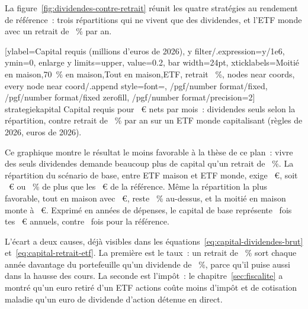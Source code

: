 La figure~\ref{fig:dividendes-contre-retrait} r\'eunit les quatre strat\'egies au rendement de
r\'ef\'erence~: trois r\'epartitions qui ne vivent que des dividendes, et l'ETF monde avec un retrait
de \TauxRetrait~\% par an.

[ylabel={Capital requis (millions d'euros de 2026)},
  y filter/.expression={y/1e6}, ymin=0, enlarge y limits={upper, value=0.2}, bar width=24pt,
  xticklabels={{Moiti\'e en maison},{70~\% en maison},{Tout en maison},{ETF, retrait \TauxRetrait~\%}},
  nodes near coords, every node near coord/.append style={font=\scriptsize,
    /pgf/number format/fixed, /pgf/number format/fixed zerofill, /pgf/number format/precision=2}]%
  {strategie}{kapital}%
  {Capital requis pour \ZielMonat~€ nets par mois~: dividendes seuls selon la r\'epartition, contre
  retrait de \TauxRetrait~\% par an sur un ETF monde capitalisant (r\`egles de 2026, euros de
  2026).\label{fig:dividendes-contre-retrait}}

Ce graphique montre le r\'esultat le moins favorable \`a la th\`ese de ce plan~: vivre des seuls
dividendes demande beaucoup plus de capital qu'un retrait de \TauxRetrait~\%. La r\'epartition du
sc\'enario de base, \ReferenzStrategie{} entre ETF maison et ETF monde, exige \KapitalMaisonSiebzig~€, soit \KapitalDifferenzSiebzigEuro~€ ou
\KapitalDifferenzSiebzigProzent~\% de plus que les \KapitalEtfReferenz~€ de la r\'ef\'erence. M\^eme
la r\'epartition la plus favorable, tout en maison avec \KapitalMaisonHundert~€, reste
\KapitalDifferenzProzent~\% au-dessus, et la moiti\'e en maison monte \`a \KapitalMaisonFuenfzig~€.
Exprim\'e en ann\'ees de d\'epenses, le capital de base repr\'esente \MultipleMaisonSiebzig~fois tes
\ZielJahr~€ annuels, contre \MultipleEtfReferenz~fois pour la r\'ef\'erence.

L'\'ecart a deux causes, d\'ej\`a visibles dans les \'equations~\eqref{eq:capital-dividendes-brut}
et~\eqref{eq:capital-retrait-etf}. La premi\`ere est le taux~: un retrait de \TauxRetrait~\% sort
chaque ann\'ee davantage du portefeuille qu'un dividende de \RenditeDivMaison~\%, parce qu'il puise
aussi dans la hausse des cours. La seconde est l'imp\^ot~: le chapitre~\ref{sec:fiscalite} a montr\'e
qu'un euro retir\'e d'un ETF actions co\^ute moins d'imp\^ot et de cotisation maladie qu'un euro de
dividende d'action d\'etenue en direct.


